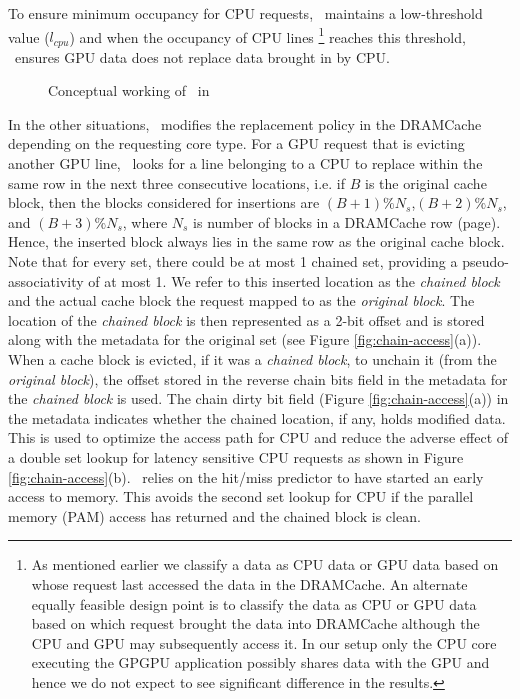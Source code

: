 To ensure minimum occupancy for CPU requests, \chaining\ maintains a low-threshold value (\textit{$l_{cpu}$}) and when the occupancy of CPU lines
\footnote{As mentioned earlier we classify a data as CPU data or GPU data based on whose request last accessed the data in the DRAMCache. An alternate equally feasible design point is to classify the data as CPU or GPU data based on which request brought the data into DRAMCache although the CPU and GPU may subsequently access it. In our setup only the CPU core executing the GPGPU application possibly shares data with the GPU and hence we do not expect to see significant difference in the results.} 
reaches this threshold, \chaining\ ensures GPU data does not replace data brought in by CPU. 

\begin{figure}
	\centering
	\def\svgwidth{0.45\linewidth}
	
	\caption{Conceptual working of \chaining\ in \cachename}
	\label{fig:chaining-concept}
\end{figure}

In the other situations, \cachename\ modifies the replacement policy in the DRAMCache depending on the requesting core type. For a GPU request that is evicting another GPU line, \cachename\ looks for a line belonging to a CPU to replace within the same row in the next three consecutive locations,
i.e. if $B$ is the original cache block, then the blocks considered for insertions are $(B+1)\%N_s$,$(B+2)\%N_s$, and $(B+3)\%N_s$, where $N_s$ is number of blocks in a DRAMCache row (page). Hence, the inserted block always lies in the same row as the original cache block. Note that for every set, there could be at most 1 chained set, providing a pseudo-associativity of at most 1.  
We refer to this inserted location as the \textit{chained block} and the actual cache block the request mapped to as the \textit{original block}. The location of the \textit{chained block} is then represented as a 2-bit offset and is stored along with the metadata for the original set (see Figure \ref{fig:chain-access}(a)). When a cache block is evicted, if it was a \textit{chained block}, to unchain it (from the \textit{original block}), the offset stored in the reverse chain bits field in the metadata for the \textit{chained block} is used.  
The chain dirty bit field (Figure \ref{fig:chain-access}(a)) in the metadata indicates whether the chained location, if any, holds modified data. This is used to optimize the access path for CPU and reduce the adverse effect of a double set lookup for latency sensitive CPU requests as shown in Figure \ref{fig:chain-access}(b). \chaining\ relies on the hit/miss predictor to have started an early access to memory. This avoids the second set lookup for CPU if the parallel memory (PAM) access has returned and the chained block is clean. 


